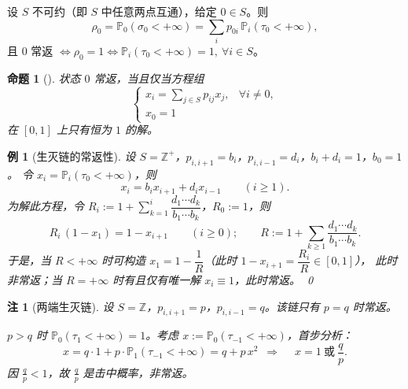 \documentclass[lang=cn,10pt,newtx,thmcnt=chapter,mode=simple]{vividbook}
\providecommand{\Z}{}\renewcommand{\Z}{\mathbb{Z}}
\providecommand{\Pp}{}\renewcommand{\Pp}{\mathbb{P}}
\newcommand{\darr}{\;\Rightarrow\;}
\theoremstyle{vividthm}
\newtheorem*{vividproposition}{命题}
\theoremstyle{vividdef}
\theoremstyle{vividexa}
\newtheorem*{vividexample}{例}
\theoremstyle{vividrem}
\newtheorem*{vividremark}{注}
\renewenvironment{proposition}[1][]{\begin{vividproposition}[#1]}{\end{vividproposition}}
\renewenvironment{remark}[1][]{\begin{vividremark}[#1]}{\end{vividremark}}
\newenvironment{example}[1][]{\begin{vividexample}[#1]}{\end{vividexample}}
\begin{document}
设 $S$ 不可约（即 $S$ 中任意两点互通），给定 $0\in S$。则
\[
\rho_0=\Pp_0(\sigma_0<+\infty)=\sum_i p_{0i}\,\Pp_i(\tau_0<+\infty),
\]
且 $0$ 常返 $\iff\rho_0=1\iff \Pp_i(\tau_0<+\infty)=1,\ \forall i\in S$。

\begin{proposition}
状态 $0$ 常返，当且仅当方程组
\[
\begin{cases}
x_i=\sum_{j\in S}p_{ij}x_j, & \forall i\ne0,\\
x_0=1
\end{cases}
\]
在 $[0,1]$ 上只有恒为 $1$ 的解。
\end{proposition}

\begin{example}[生灭链的常返性]
设 $S=\Z^+$，$p_{i,i+1}=b_i$，$p_{i,i-1}=d_i$，$b_i+d_i=1$，$b_0=1$。
令 $x_i=\Pp_i(\tau_0<+\infty)$，则
\[
x_i=b_ix_{i+1}+d_ix_{i-1}\qquad(i\ge1).
\]
为解此方程，令 $R_i:=1+\sum_{k=1}^{i}\dfrac{d_1\cdots d_k}{b_1\cdots b_k}$，$R_0:=1$，则
\[
R_i\,(1-x_1)=1-x_{i+1}\qquad(i\ge0);
\qquad
R:=1+\sum_{k\ge1}\frac{d_1\cdots d_k}{b_1\cdots b_k}.
\]
于是，当 $R<+\infty$ 时可构造 $x_1=1-\dfrac1R$（此时 $1-x_{i+1}=\dfrac{R_i}{R}\in[0,1]$），
此时非常返；当 $R=+\infty$ 时有且仅有唯一解 $x_i\equiv1$，此时常返。 \qed
\end{example}

\begin{remark}[两端生灭链]
设 $S=\Z$，$p_{i,i+1}=p$，$p_{i,i-1}=q$。该链只有 $p=q$ 时常返。

$p>q$ 时 $\Pp_0(\tau_1<+\infty)=1$。考虑 $x:=\Pp_0(\tau_{-1}<+\infty)$，首步分析：
\[
x=q\cdot1+p\cdot\Pp_1(\tau_{-1}<+\infty)=q+p\,x^2
\ \darr\quad x=1\ \text{或}\ \frac{q}{p}.
\]
因 $\tfrac qp<1$，故 $\tfrac qp$ 是击中概率，非常返。
\end{remark}
\end{document}
